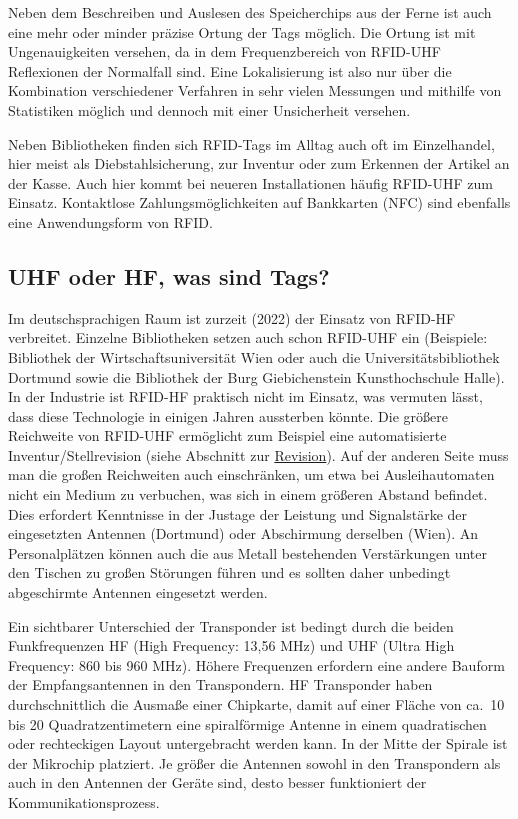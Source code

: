 \documentclass[
  11pt,
  letterpaper,
  DIV=11,
  twoside]{scrreprt}
\begin{document}
Neben dem Beschreiben und Auslesen des Speicherchips aus der Ferne ist
auch eine mehr oder minder präzise Ortung der Tags möglich. Die Ortung
ist mit Ungenauigkeiten versehen, da in dem Frequenzbereich von RFID-UHF
Reflexionen der Normalfall sind. Eine Lokalisierung ist also nur über
die Kombination verschiedener Verfahren in sehr vielen Messungen und
mithilfe von Statistiken möglich und dennoch mit einer Unsicherheit
versehen.

Neben Bibliotheken finden sich RFID-Tags im Alltag auch oft im
Einzelhandel, hier meist als Diebstahlsicherung, zur Inventur oder zum
Erkennen der Artikel an der Kasse. Auch hier kommt bei neueren
Installationen häufig RFID-UHF zum Einsatz. Kontaktlose
Zahlungsmöglichkeiten auf Bankkarten (NFC) sind ebenfalls eine
Anwendungsform von RFID.

\subsection{UHF oder HF, was sind
Tags?}\label{uhf-oder-hf-was-sind-tags}

Im deutschsprachigen Raum ist zurzeit (2022) der Einsatz von RFID-HF
verbreitet. Einzelne Bibliotheken setzen auch schon RFID-UHF ein
(Beispiele: Bibliothek der Wirtschaftsuniversität Wien oder auch die
Universitätsbibliothek Dortmund sowie die Bibliothek der Burg
Giebichenstein Kunsthochschule Halle). In der Industrie ist RFID-HF
praktisch nicht im Einsatz, was vermuten lässt, dass diese Technologie
in einigen Jahren aussterben könnte. Die größere Reichweite von RFID-UHF
ermöglicht zum Beispiel eine automatisierte Inventur/Stellrevision
(siehe Abschnitt zur \hyperref[revision]{Revision}). Auf der anderen
Seite muss man die großen Reichweiten auch einschränken, um etwa bei
Ausleihautomaten nicht ein Medium zu verbuchen, was sich in einem
größeren Abstand befindet. Dies erfordert Kenntnisse in der Justage der
Leistung und Signalstärke der eingesetzten Antennen (Dortmund) oder
Abschirmung derselben (Wien). An Personalplätzen können auch die aus
Metall bestehenden Verstärkungen unter den Tischen zu großen Störungen
führen und es sollten daher unbedingt abgeschirmte Antennen eingesetzt
werden.

Ein sichtbarer Unterschied der Transponder ist bedingt durch die beiden
Funkfrequenzen HF (High Frequency: 13,56 MHz) und UHF (Ultra High
Frequency: 860 bis 960 MHz). Höhere Frequenzen erfordern eine andere
Bauform der Empfangsantennen in den Transpondern. HF Transponder haben
durchschnittlich die Ausmaße einer Chipkarte, damit auf einer Fläche von
ca.~10 bis 20 Quadratzentimetern eine spiralförmige Antenne in einem
quadratischen oder rechteckigen Layout untergebracht werden kann. In der
Mitte der Spirale ist der Mikrochip platziert. Je größer die Antennen
sowohl in den Transpondern als auch in den Antennen der Geräte sind,
desto besser funktioniert der Kommunikationsprozess.
\end{document}
